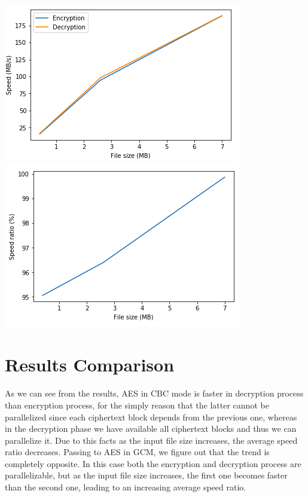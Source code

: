 \documentclass[11pt]{article}
\begin{document}
\begin{center}
\includegraphics[scale=0.4]{./aes_gcm_speed_comparison_images.png}
\includegraphics[scale=0.4]{./aes_gcm_speed_ratio_images.png}
\end{center}
\section{Results Comparison}
As we can see from the results, AES in CBC mode is faster in decryption process than encryption process, for the simply reason that the latter cannot be parallelized since each ciphertext block depends from the previous one, whereas in the decryption phase we have available all ciphertext blocks and thus we can parallelize it. Due to this facts as the input file size increases, the average speed ratio decreases. Passing to AES in GCM, we figure out that the trend is completely opposite. In this case both the encryption and decryption process are parallelizable, but as the input file size increases, the first one becomes faster than the second one, leading to an increasing average speed ratio.
\end{document}
